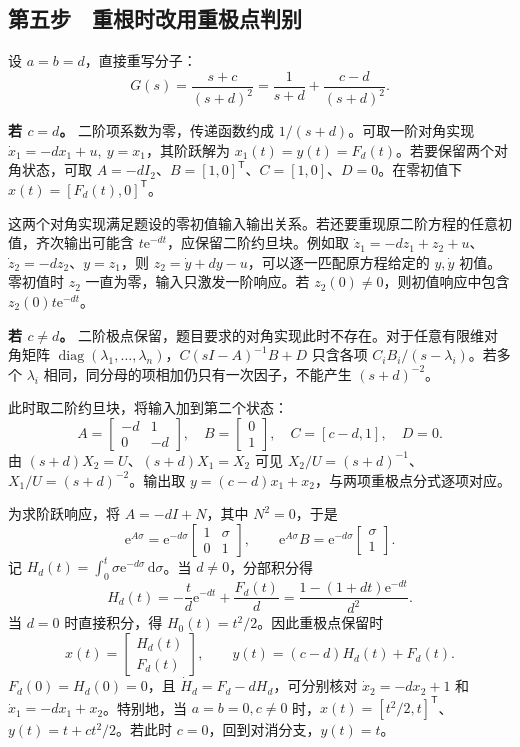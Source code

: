 \subsection{第五步　重根时改用重极点判别}

设 $a=b=d$，直接重写分子：
\[
 G(s)=\frac{s+c}{(s+d)^2}
     =\frac{1}{s+d}+\frac{c-d}{(s+d)^2}.
\]

\textbf{若 $c=d$。} 二阶项系数为零，传递函数约成 $1/(s+d)$。可取一阶对角实现 $\dot x_1=-dx_1+u,\ y=x_1$，其阶跃解为 $x_1(t)=y(t)=F_d(t)$。若要保留两个对角状态，可取 $A=-dI_2$、$B=[1,0]^{\mathsf T}$、$C=[1,0]$、$D=0$。在零初值下 $x(t)=[F_d(t),0]^{\mathsf T}$。

这两个对角实现满足题设的零初值输入输出关系。若还要重现原二阶方程的任意初值，齐次输出可能含 $t\mathrm e^{-dt}$，应保留二阶约旦块。例如取 $\dot z_1=-dz_1+z_2+u$、$\dot z_2=-dz_2$、$y=z_1$，则 $z_2=\dot y+dy-u$，可以逐一匹配原方程给定的 $y,\dot y$ 初值。零初值时 $z_2$ 一直为零，输入只激发一阶响应。若 $z_2(0)\ne0$，则初值响应中包含 $z_2(0)t\mathrm e^{-dt}$。

\textbf{若 $c\ne d$。} 二阶极点保留，题目要求的对角实现此时不存在。对于任意有限维对角矩阵 $\operatorname{diag}(\lambda_1,\ldots,\lambda_n)$，$C(sI-A)^{-1}B+D$ 只含各项 $C_iB_i/(s-\lambda_i)$。若多个 $\lambda_i$ 相同，同分母的项相加仍只有一次因子，不能产生 $(s+d)^{-2}$。

此时取二阶约旦块，将输入加到第二个状态：
\[
 \boxed{
 A=\begin{bmatrix}-d&1\\0&-d\end{bmatrix},\quad
 B=\begin{bmatrix}0\\1\end{bmatrix},\quad C=[c-d,1],\quad D=0.
 }
\]
由 $(s+d)X_2=U$、$(s+d)X_1=X_2$ 可见 $X_2/U=(s+d)^{-1}$、$X_1/U=(s+d)^{-2}$。输出取 $y=(c-d)x_1+x_2$，与两项重极点分式逐项对应。

为求阶跃响应，将 $A=-dI+N$，其中 $N^2=0$，于是
\[
 \mathrm e^{A\sigma}=\mathrm e^{-d\sigma}
   \begin{bmatrix}1&\sigma\\0&1\end{bmatrix},\qquad
 \mathrm e^{A\sigma}B=\mathrm e^{-d\sigma}\begin{bmatrix}\sigma\\1\end{bmatrix}.
\]
记 $H_d(t)=\int_0^t\sigma\mathrm e^{-d\sigma}\,\mathrm d\sigma$。当 $d\ne0$，分部积分得
\[
 H_d(t)
 =-\frac{t}{d}\mathrm e^{-dt}+\frac{F_d(t)}{d}
 =\frac{1-(1+dt)\mathrm e^{-dt}}{d^2}.
\]
当 $d=0$ 时直接积分，得 $H_0(t)=t^2/2$。因此重极点保留时
\[
 \boxed{x(t)=\begin{bmatrix}H_d(t)\\F_d(t)\end{bmatrix},\qquad
 y(t)=(c-d)H_d(t)+F_d(t).}
\]
$F_d(0)=H_d(0)=0$，且 $\dot H_d=F_d-dH_d$，可分别核对 $\dot x_2=-dx_2+1$ 和 $\dot x_1=-dx_1+x_2$。特别地，当 $a=b=0,c\ne0$ 时，$x(t)=[t^2/2,t]^{\mathsf T}$、$y(t)=t+ct^2/2$。若此时 $c=0$，回到对消分支，$y(t)=t$。

